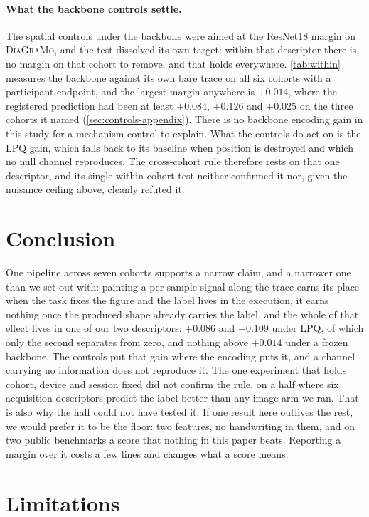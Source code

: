 \documentclass{article}
\begin{document}
\paragraph{What the backbone controls settle.} The spatial controls under the backbone were aimed at
the ResNet18 margin on \textsc{DiaGraMo}, and the test dissolved its own target: within that
descriptor there is no margin on that cohort to remove, and that holds
everywhere. \cref{tab:within} measures the backbone against its own bare trace on all six cohorts
with a participant endpoint, and the largest margin anywhere is $+0.014$, where the registered
prediction had been at least $+0.084$, $+0.126$ and $+0.025$ on the three cohorts it named
(\cref{sec:controls-appendix}). There is no backbone encoding gain in this study for a mechanism
control to explain. What the controls do act on is the LPQ gain, which falls back to its baseline
when position is destroyed and which no null channel reproduces.
The cross-cohort rule therefore rests on that one descriptor, and its single within-cohort test
neither confirmed it nor, given the nuisance ceiling above, cleanly refuted it.

\section{Conclusion}
\label{sec:conclusion}

One pipeline across seven cohorts supports a narrow claim, and a narrower one than we set out with:
painting a per-sample signal along the trace earns its place when the task fixes the figure and the
label lives in the execution, it earns nothing once the produced shape already carries the label,
and the whole of that effect lives in one of our two descriptors: $+0.086$ and $+0.109$ under
LPQ, of which only the second separates from zero, and nothing above $+0.014$ under a frozen
backbone. The controls put that gain where the encoding puts it, and a channel carrying no
information does not reproduce it. The one experiment that holds cohort, device and session fixed
did not confirm the rule, on a half where six acquisition descriptors predict the label better than
any image arm we ran. That is also why the half could not have tested it. If one result here
outlives the rest, we would
prefer it to be the floor: two features, no handwriting in them, and on two public benchmarks a
score that nothing in this paper beats. Reporting a margin over it costs a few lines and changes
what a score means.

\section{Limitations}
\label{sec:limitations}
\end{document}
